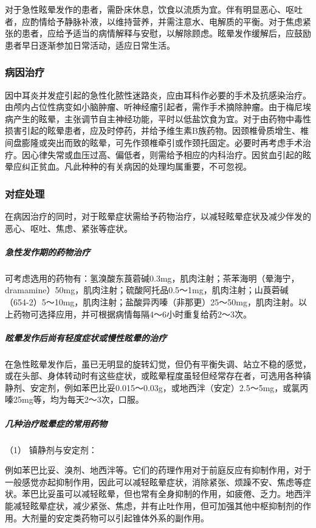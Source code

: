 对于急性眩晕发作的患者，需卧床休息，饮食以流质为宜。伴有明显恶心、呕吐者，应酌情给予静脉补液，以维持营养，并需注意水、电解质的平衡。对于焦虑紧张的患者，应给予适当的病情解释与安慰，以解除顾虑。眩晕发作缓解后，应鼓励患者早日逐渐参加日常活动，适应日常生活。

\subsubsection{病因治疗}

因中耳炎并发症引起的急性化脓性迷路炎，应由耳科作必要的手术及抗感染治疗。由颅内占位性病变如小脑肿瘤、听神经瘤引起者，需作手术摘除肿瘤。由于梅尼埃病产生的眩晕，主张调节自主神经功能，平时以低盐饮食为宜。对于由药物中毒性损害引起的眩晕患者，应及时停药，并给予维生素B族药物。因颈椎骨质增生、椎间盘膨隆或突出而致的眩晕，可先作颈椎牵引或作颈托固定。必要时再考虑手术治疗。因心律失常或血压过高、偏低者，则需给予相应的内科治疗。因贫血引起的眩晕应纠正贫血。凡此种种的有关病因的处理均属重要，不可忽视。

\subsubsection{对症处理}

在病因治疗的同时，对于眩晕症状需给予药物治疗，以减轻眩晕症状及减少伴发的恶心、呕吐、焦虑、紧张等症状。

\subparagraph{急性发作期的药物治疗}

可考虑选用的药物有：氢溴酸东莨菪碱0.3mg，肌肉注射；茶苯海明（晕海宁，dramamine）50mg，肌肉注射；硫酸阿托品0.5～1mg，肌肉注射；山莨菪碱（654-2）5～10mg，肌肉注射；盐酸异丙嗪（非那更）25～50mg，肌肉注射。以上药物可选择应用，并可根据病情每隔4～6小时重复给药2～3次。

\subparagraph{眩晕发作后尚有轻度症状或慢性眩晕的治疗}

在急性眩晕发作后，虽已无明显的旋转幻觉，但仍有平衡失调、站立不稳的感觉，或在头部、身体转动时有这些症状，或眩晕程度虽轻但经常存在者，可选用各种镇静剂、安定剂，例如苯巴比妥0.015～0.03g，或地西泮（安定）2.5～5mg，或氯丙嗪25mg等，均为每天2～3次，口服。

\subparagraph{几种治疗眩晕症的常用药物}

\hypertarget{text00012.htmlux5cux23CHP1-3-3-3-3-1}{}
（1） 镇静剂与安定剂：

例如苯巴比妥、溴剂、地西泮等。它们的药理作用对于前庭反应有抑制作用，对于一般感觉亦起抑制作用，因此可以减轻眩晕症状，消除紧张、烦躁不安、焦虑等症状。苯巴比妥虽可以减轻眩晕，但也常有全身抑制的作用，如疲倦、乏力。地西泮能减轻眩晕症状，减少紧张、焦虑，并有止吐作用，但可加强其他中枢抑制剂的作用。大剂量的安定类药物可以引起锥体外系的副作用。

